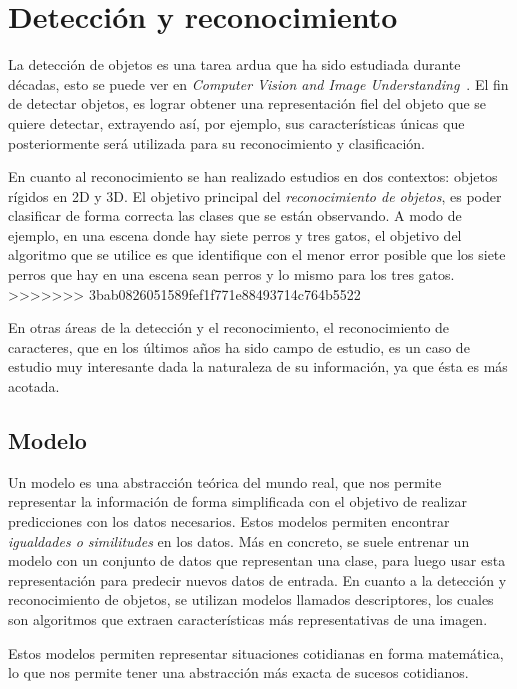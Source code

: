 \section{Detección y reconocimiento}
La detección de objetos es una tarea ardua que ha sido estudiada durante décadas, esto se puede ver en \textit{Computer Vision and Image Understanding}~\cite{survey2005}. El fin de detectar objetos, es lograr obtener una representación fiel del objeto que se quiere detectar, extrayendo así, por ejemplo, sus características únicas que posteriormente será utilizada para su reconocimiento y clasificación.

En cuanto al reconocimiento se han realizado estudios en dos contextos: objetos rígidos en 2D y 3D. El objetivo principal del \textit{reconocimiento de objetos}, es poder clasificar de forma correcta las clases que se están observando. A modo de ejemplo, en una escena donde hay siete perros y tres gatos, el objetivo del algoritmo que se utilice es que identifique con el menor error posible que los siete perros que hay en una escena sean perros y lo mismo para los tres gatos.
>>>>>>> 3bab0826051589fef1f771e88493714c764b5522

En otras áreas de la detección y el reconocimiento, el reconocimiento de caracteres, que en los últimos años ha sido campo de estudio, es un caso de estudio muy interesante dada la naturaleza de su información, ya que ésta es más acotada. 

\subsection{Modelo}
\label{subsec:modelo}
Un modelo es una abstracción teórica del mundo real, que nos permite representar la información de forma simplificada con el objetivo de realizar predicciones con los datos necesarios. Estos modelos permiten encontrar \textit{igualdades o similitudes} en los datos. Más en concreto, se suele entrenar un modelo con un conjunto de datos que representan una clase, para luego usar esta representación para predecir nuevos datos de entrada. En cuanto a la detección y reconocimiento de objetos, se utilizan modelos llamados descriptores, los cuales son algoritmos que extraen características más representativas de una imagen. 

\begin{definition}
Estos modelos permiten representar situaciones cotidianas en forma matemática, lo que nos permite tener una abstracción más exacta de sucesos cotidianos.
\end{definition}
 

